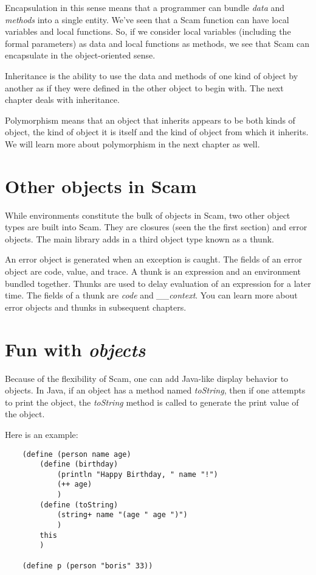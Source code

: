 Encapsulation in this sense means that a programmer
can bundle {\it data} and {\it methods} into a single entity.
We've seen that a Scam function can
have local variables and local functions.
So, if we consider local variables (including the formal
parameters) as data and local
functions as methods, we see that Scam can encapsulate
in the object-oriented sense.

Inheritance is the ability to use the data and methods
of one kind of object by another as if they were defined
in the other object to begin with.
The next chapter deals with inheritance.

Polymorphism means that an object that inherits appears
to be both kinds of object, the kind of object it is
itself and the kind of object from which it inherits.
We will learn more about
polymorphism in the next chapter as well.

\section{Other objects in Scam}

While environments constitute the bulk of objects in
Scam, two other object types are built into Scam. They are closures
(seen the the first section) and error objects. The
main library adds in a third object type known as a thunk.

An error object is generated when an exception is caught.
The fields of an error object are code, value, and trace.
A thunk is an expression and an environment bundled
together. Thunks are used to delay evaluation of
an expression for a later time. The fields of a thunk
are {\it code} and {\it \_\_context}.
You can learn more about error objects and thunks
in subsequent chapters.

\section{Fun with {\it objects}}

Because of the flexibility of Scam, one can
add Java-like display behavior to objects.
In Java, if an object has a method named {\it toString},
then if one attempts to print the object, the {\it toString}
method is called to generate the print value of the object.

Here is an example:

\begin{verbatim}
    (define (person name age)
        (define (birthday)
            (println "Happy Birthday, " name "!")
            (++ age)
            )
        (define (toString)
            (string+ name "(age " age ")")
            )
        this
        )

    (define p (person "boris" 33))
\end{verbatim}

